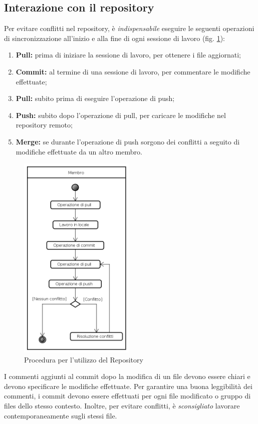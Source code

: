 \subsection{Interazione con il repository}
\label{Interazione con il repository}
Per evitare conflitti nel repository, è \emph{indispensabile} eseguire le seguenti operazioni di sincronizzazione all'inizio e alla fine di ogni sessione di lavoro (fig. \ref{usorepo}):
\begin{enumerate}
\item \textbf{Pull:} prima di iniziare la sessione di lavoro, per ottenere i file aggiornati;
\item \textbf{Commit:} al termine di una sessione di lavoro, per commentare le modifiche effettuate;
\item \textbf{Pull:} subito prima di eseguire l'operazione di push;
\item \textbf{Push:} subito dopo l'operazione di pull, per caricare le modifiche nel repository\glossario{} remoto;
\item \textbf{Merge:} se durante l'operazione di push sorgono dei conflitti a seguito di modifiche effettuate da un altro membro.
\end{enumerate}
\begin{figure}[!h]
	\centering
	\includegraphics[height=10cm]{./content/Immagini/Utilizzo_Repository.png}
	\caption{Procedura per l'utilizzo del Repository}
	\label{usorepo}
\end{figure}
I commenti aggiunti al commit dopo la modifica di un file devono essere chiari e devono specificare le modifiche effettuate. Per garantire una buona leggibilità dei commenti, i commit devono essere effettuati per ogni file modificato o gruppo di files dello stesso contesto. Inoltre, per evitare conflitti, è \emph{sconsigliato} lavorare contemporaneamente sugli stessi file.

